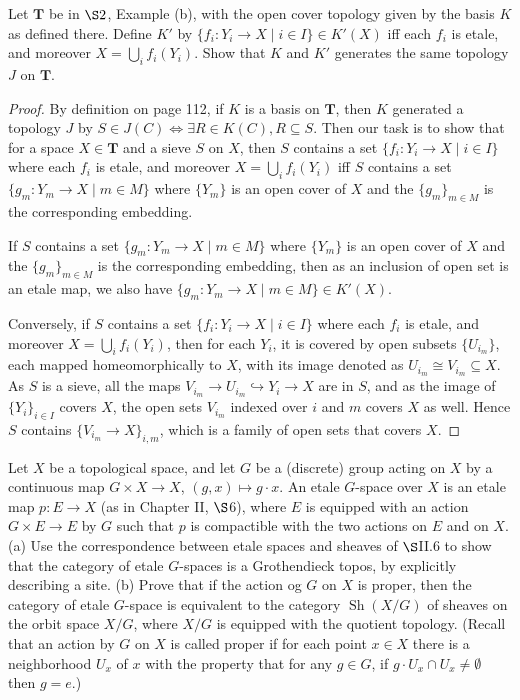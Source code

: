 \documentclass[a4paper]{article}
\DeclareMathOperator{\Sh}{\text {Sh}}
\begin{document}
\begin{question}
    Let $\mathbf T$ be in $\S 2$, Example (b), with the open cover topology given by the basis $K$ as defined there. Define $K'$ by $\{f_i:Y_i\to X\mid i\in I\}\in K'(X)$ iff each $f_i$ is etale, and moreover $X=\bigcup_i f_i(Y_i)$. Show that $K$ and $K'$ generates the same topology $J$ on $\mathbf T$.
\end{question}
\begin{proof}
   By definition on page 112, if $K$ is a basis on $\mathbf T$, then $K$ generated a topology $J$ by $S\in J(C)\Leftrightarrow \exists R\in K(C), R\subseteq S$. Then our task is to show that for a space $X\in \mathbf T$ and a sieve $S$ on $X$, then $S$ contains a set $\{f_i:Y_i\to X\mid i\in I\}$ where each $f_i$ is etale, and moreover $X=\bigcup_i f_i(Y_i)$ iff $S$ contains a set $\{g_m:Y_m\to X\mid m\in M\}$ where $\{Y_m\}$ is an open cover of $X$ and the $\{g_m\}_{m\in M}$ is the corresponding embedding. 

   If $S$ contains a set $\{g_m:Y_m\to X\mid m\in M\}$ where $\{Y_m\}$ is an open cover of $X$ and the $\{g_m\}_{m\in M}$ is the corresponding embedding, then as an inclusion of open set is an etale map, we also have $\{g_m:Y_m\to X\mid m\in M\}\in K'(X)$. 

   Conversely, if $S$ contains a set $\{f_i:Y_i\to X\mid i\in I\}$ where each $f_i$ is etale, and moreover $X=\bigcup_i f_i(Y_i)$, then for each $Y_i$, it is covered by open subsets $\{U_{i_m}\}$, each mapped homeomorphically to $X$, with its image denoted as $U_{i_m}\cong V_{i_m}\subseteq X$. As $S$ is a sieve, all the maps $V_{i_m}\to U_{i_m}\hookrightarrow Y_i\to X$ are in $S$, and as the image of $\{Y_i\}_{i\in I}$ covers $X$, the open sets $V_{i_m}$ indexed over $i$ and $m$ covers $X$ as well. Hence $S$ contains $\{V_{i_m}\to X\}_{i,m}$, which is a family of open sets that covers $X$.    


\end{proof}
\begin{question}
    Let $X$ be a topological space, and let $G$ be a (discrete) group acting on $X$ by a continuous map $G\times X\to X$, $(g,x)\mapsto g\cdot x$. An etale $G$-space over $X$ is an etale map $p:E\to X$ (as in Chapter II, $\S$6), where $E$ is equipped with an action $G\times E\to E$ by $G$ such that $p$ is compactible with the two actions on $E$ and on $X$.\newline
    (a) Use the correspondence between etale spaces and sheaves of $\S$II.6 to show that the category of etale $G$-spaces is a Grothendieck topos, by explicitly describing a site. \newline
    (b) Prove that if the action og $G$ on $X$ is proper, then the category of etale $G$-space is equivalent to the category $\Sh(X/G)$ of sheaves on the orbit space $X/G$, where $X/G$ is equipped with the quotient topology. (Recall that an action by $G$ on $X$ is called proper if for each point $x\in X$ there is a neighborhood $U_x$ of $x$ with the property that for any $g\in G$, if $g\cdot U_x\cap U_x\ne\emptyset$ then $g=e$.)
\end{question}
\end{document}
